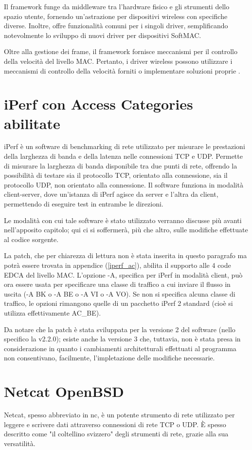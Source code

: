 Il framework funge da middleware tra l'hardware fisico e gli strumenti dello spazio utente, fornendo un'astrazione per dispositivi wireless con specifiche diverse. Inoltre, offre funzionalità comuni per i singoli driver, semplificando notevolmente lo sviluppo di nuovi driver per dispositivi SoftMAC.

Oltre alla gestione dei frame, il framework fornisce meccanismi per il controllo della velocità del livello MAC. Pertanto, i driver wireless possono utilizzare i meccanismi di controllo della velocità forniti o implementare soluzioni proprie \cite{wireless-profiling}.


\section{iPerf con Access Categories abilitate}
iPerf è un software di benchmarking di rete utilizzato per misurare le prestazioni della larghezza di banda e della latenza nelle connessioni TCP e UDP. Permette di misurare la larghezza di banda disponibile tra due punti di rete, offrendo la possibilità di testare sia il protocollo TCP, orientato alla connessione, sia il protocollo UDP, non orientato alla connessione. Il software funziona in modalità client-server, dove un'istanza di iPerf agisce da server e l'altra da client, permettendo di eseguire test in entrambe le direzioni.

Le modalità con cui tale software è stato utilizzato verranno discusse più avanti nell'apposito capitolo; qui ci si soffermerà, più che altro, sulle modifiche effettuate al codice sorgente.

La patch, che per chiarezza di lettura non è stata inserita in questo paragrafo ma potrà essere trovata in appendice (\autoref{iperf_ac}), abilita il supporto alle 4 code EDCA del livello MAC. L'opzione -A, specifica per iPerf in modalità client, può ora essere usata per specificare una classe di traffico a cui inviare il flusso in uscita (-A BK o -A BE o -A VI o -A VO). Se non si specifica alcuna classe di traffico, le opzioni rimangono quelle di un pacchetto iPerf 2 standard (cioè si utilizza effettivamente AC\_BE).

Da notare che la patch è stata sviluppata per la versione 2 del software (nello specifico la v2.2.0); esiste anche la versione 3 che, tuttavia, non è stata presa in considerazione in quanto i cambiamenti architetturali effettuati al programma non consentivano, facilmente, l'impletazione delle modifiche necessarie.

\section{Netcat OpenBSD}
Netcat, spesso abbreviato in nc, è un potente strumento di rete utilizzato per leggere e scrivere dati attraverso connessioni di rete TCP o UDP. È spesso descritto come "il coltellino svizzero" degli strumenti di rete, grazie alla sua versatilità.

